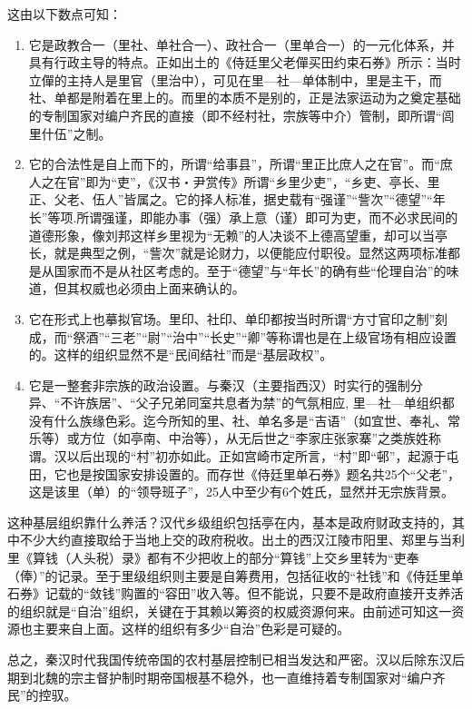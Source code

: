 \documentclass[a4paper,12pt,punct=kaiming]{ctexart}
\begin{document}
这由以下数点可知：
\begin{enumerate}
\item 它是政教合一（里社、单社合一）、政社合一（里单合一）的一元化体系，并具有行政主导的特点。正如出土的《侍廷里父老僤买田约束石券》所示：当时立僤的主持人是里官（里治中），可见在里—社—单体制中，里是主干，而社、单都是附着在里上的。而里的本质不是别的，正是法家运动为之奠定基础的专制国家对编户齐民的直接（即不经村社，宗族等中介）管制，即所谓“闾里什伍”之制。

\item 它的合法性是自上而下的，所谓“给事县”，所谓“里正比庶人之在官”。而“庶人之在官”即为“吏”，《汉书・尹赏传》所谓“乡里少吏”，“乡吏、亭长、里正、父老、伍人”皆属之。它的择人标准，据史载有“强谨”“訾次”“德望”“年长”等项.所谓强谨，即能办事（强）承上意（谨）即可为吏，而不必求民间的道德形象，像刘邦这样乡里视为“无赖”的人决谈不上德高望重，却可以当亭长，就是典型之例，“訾次”就是论财力，以便能应付职役。显然这两项标准都是从国家而不是从社区考虑的。至于“德望”与“年长”的确有些“伦理自治”的味道，但其权威也必须由上面来确认的。

\item 它在形式上也摹拟官场。里印、社印、单印都按当时所谓“方寸官印之制”刻成，而“祭酒”“三老”“尉”“治中”“长史”“卿”等称谓也是在上级官场有相应设置的。这样的组织显然不是“民间结社”而是“基层政权”。

\item 它是一整套非宗族的政治设置。与秦汉（主要指西汉）时实行的强制分异、“不许族居”、“父子兄弟同室共息者为禁”的气氛相应, 里—社—单组织都没有什么族缘色彩。迄今所知的里、社、单名多是“吉语”（如宜世、奉礼、常乐等）或方位（如亭南、中治等），从无后世之“李家庄张家寨”之类族姓称谓。汉以后出现的“村”初亦如此。正如宫崎市定所言，“村”即“邨”，起源于屯田，它也是按国家安排设置的。而存世《侍廷里单石券》题名共25个“父老”，这是该里（单）的“领导班子”，25人中至少有6个姓氏，显然并无宗族背景。
\end{enumerate}

这种基层组织靠什么养活？汉代乡级组织包括亭在内，基本是政府财政支持的，其中不少大约直接取给于当地上交的政府税收。出土的西汉江陵市阳里、郑里与当利里《算钱（人头税）录》都有不少把收上的部分“算钱”上交乡里转为“吏奉（俸）”的记录。至于里级组织则主要是自筹费用，包括征收的“社钱”和《侍廷里单石券》记载的“敛钱”购置的“容田”收入等。但不能说，只要不是政府直接开支养活的组织就是“自治”组织，关键在于其赖以筹资的权威资源何来。由前述可知这一资源也主要来自上面。这样的组织有多少“自治”色彩是可疑的。

总之，秦汉时代我国传统帝国的农村基层控制已相当发达和严密。汉以后除东汉后期到北魏的宗主督护制时期帝国根基不稳外，也一直维持着专制国家对“编户齐民”的控驭。
\end{document}
